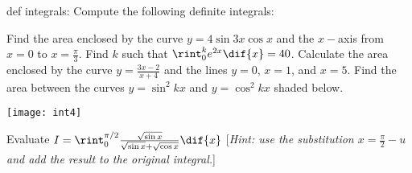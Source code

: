 def integrals:
  \questioM Compute the following definite integrals:
  \questioM Find the area enclosed by the curve $ y = 4 \sin 3x \cos x $ and the $ x-$axis from $ x = 0 $
            to $ x = \frac{\pi}{3} $.
  \questioE Find $ k $ such that $ \rint^k_0 e^{2x} \dif{x} = 40 $.
  \questioE Calculate the area enclosed by the curve $ y = \frac{3x - 2}{x + 4} $ and the lines $ y = 0 $, $ x = 1 $,
            and $ x = 5 $.
  \questioE Find the area between the curves $ y = \sin^2 kx $ and $ y = \cos^2 kx $ shaded below.
            \begin{center}
              \texttt{[image: int4]}
            \end{center}
  \questioS Evaluate $ I = \rint^{\pi/2}_0 \frac{\sqrt{\sin x}}{\sqrt{\sin x} + \sqrt{\cos x}} \dif{x} $ [\textit{Hint: use the
            substitution $ x = \frac{\pi}{2} - u $ and add the result to the original integral.}]
